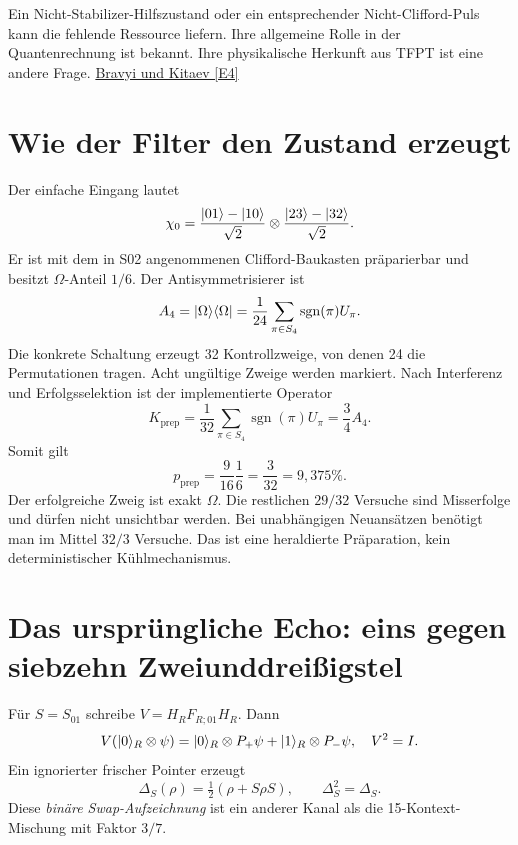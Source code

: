 Ein Nicht-Stabilizer-Hilfszustand oder ein entsprechender Nicht-Clifford-Puls kann die fehlende Ressource liefern. Ihre allgemeine Rolle in der Quantenrechnung ist bekannt. Ihre physikalische Herkunft aus TFPT ist eine andere Frage. \href{https://arxiv.org/abs/quant-ph/0403025}{Bravyi und Kitaev [E4]}

\section{Wie der Filter den Zustand erzeugt}
Der einfache Eingang lautet
\begin{equation}
\chi_0=\frac{\lvert01\rangle-\lvert10\rangle}{\sqrt2}
\otimes\frac{\lvert23\rangle-\lvert32\rangle}{\sqrt2}.
\end{equation}
Er ist mit dem in S02 angenommenen Clifford-Baukasten präparierbar und besitzt $\Omega$-Anteil $1/6$. Der Antisymmetrisierer ist
\begin{equation}
A_4=\lvert\Omega\rangle\langle\Omega\rvert
=\frac1{24}\sum_{\pi\in S_4}\operatorname{sgn}(\pi)U_\pi.
\end{equation}
Die konkrete Schaltung erzeugt 32 Kontrollzweige, von denen 24 die Permutationen tragen. Acht ungültige Zweige werden markiert. Nach Interferenz und Erfolgsselektion ist der implementierte Operator
\begin{equation}
K_{\mathrm{prep}}=\frac1{32}\sum_{\pi\in S_4}\operatorname{sgn}(\pi)U_\pi
=\frac34A_4.
\end{equation}
Somit gilt
\begin{equation}
p_{\mathrm{prep}}=\frac9{16}\frac16=\frac3{32}=9{,}375\%.
\end{equation}
Der erfolgreiche Zweig ist exakt $\Omega$. Die restlichen $29/32$ Versuche sind Misserfolge und dürfen nicht unsichtbar werden. Bei unabhängigen Neuansätzen benötigt man im Mittel $32/3$ Versuche. Das ist eine heraldierte Präparation, kein deterministischer Kühlmechanismus.

\section{Das ursprüngliche Echo: eins gegen siebzehn Zweiunddreißigstel}
Für $S=S_{01}$ schreibe $V=H_RF_{R;01}H_R$. Dann
\begin{equation}
V(\lvert0\rangle_R\otimes\psi)=\lvert0\rangle_R\otimes P_+\psi+\lvert1\rangle_R\otimes P_-\psi,
\quad V^2=I.
\end{equation}
Ein ignorierter frischer Pointer erzeugt
\begin{equation}
\Delta_S(\rho)=\tfrac12(\rho+S\rho S),\qquad\Delta_S^2=\Delta_S.
\end{equation}
Diese \emph{binäre Swap-Aufzeichnung} ist ein anderer Kanal als die 15-Kontext-Mischung mit Faktor $3/7$.

